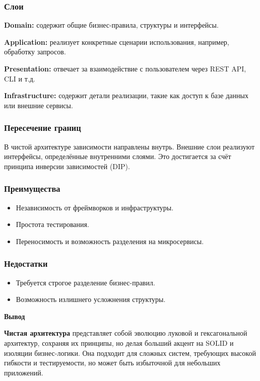 \subsubsection{Слои}
\textbf{Domain:} содержит общие бизнес-правила, структуры и интерфейсы.

\textbf{Application:} реализует конкретные сценарии использования, например, обработку запросов.

\textbf{Presentation:} отвечает за взаимодействие с пользователем через REST API, CLI и т.д.

\textbf{Infrastructure:} содержит детали реализации, такие как доступ к базе данных или внешние сервисы.

\subsubsection{Пересечение границ}
В чистой архитектуре зависимости направлены внутрь\cite{hombergs2020dirty}. Внешние слои реализуют интерфейсы, определённые внутренними слоями. Это достигается за счёт принципа инверсии зависимостей (DIP).

\subsubsection{Преимущества}
\begin{itemize}
    \item Независимость от фреймворков и инфраструктуры.
    \item Простота тестирования.
    \item Переносимость и возможность разделения на микросервисы.
\end{itemize}

\subsubsection{Недостатки}
\begin{itemize}
    \item Требуется строгое разделение бизнес-правил.
    \item Возможность излишнего усложнения структуры.
\end{itemize}


\textbf{Вывод}


\textbf{Чистая архитектура} представляет собой эволюцию луковой и гексагональной архитектур, сохраняя их принципы, но делая больший акцент на SOLID и изоляции бизнес-логики. Она подходит для сложных систем, требующих высокой гибкости и тестируемости, но может быть избыточной для небольших приложений.


